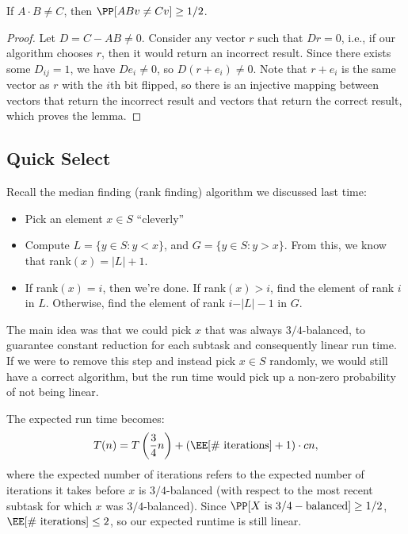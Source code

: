 \begin{theorem}
\lemlabel

If $A\cdot B\neq C$, then $\PP[ABv\neq Cv]\geq 1/2$.
\end{theorem}

\begin{proof}
Let $D = C-AB \neq 0$. Consider any vector $r$ such that $Dr=0$, i.e., if our algorithm chooses $r$, then it would return an incorrect result. Since there exists some $D_{ij}=1$, we have $De_{i}\neq 0$, so $D(r+e_{i})\neq 0$. Note that $r+e_{i}$ is the same vector as $r$ with the $i$th bit flipped, so there is an injective mapping between vectors that return the incorrect result and vectors that return the correct result, which proves the lemma. 
\end{proof}

\subsection{Quick Select}

Recall the median finding (rank finding) algorithm we discussed last time: 
\begin{itemize}
    \item Pick an element $x\in S$ ``cleverly''
    \item Compute $L = \{y\in S : y < x\}$, and $G = \{y\in S : y > x\}$. From this, we know that rank$(x) = \vert L\vert + 1$. 
    \item If rank$(x) = i$, then we're done. If rank$(x) > i$, find the element of rank $i$ in $L$. Otherwise, find the element of rank $i-\vert L\vert - 1$ in $G$.
\end{itemize}
The main idea was that we could pick $x$ that was always $3/4$-balanced, to guarantee constant reduction for each subtask and consequently linear run time. If we were to remove this step and instead pick $x\in S$ randomly, we would still have a correct algorithm, but the run time would pick up a non-zero probability of not being linear.

The expected run time becomes:
\[T(n) = T\left(\frac{3}{4}n\right) + \left(\EE[\text{\# iterations}] + 1\right)\cdot cn,\]
where the expected number of iterations refers to the expected number of iterations it takes before $x$ is $3/4$-balanced (with respect to the most recent subtask for which $x$ was $3/4$-balanced). Since $\PP[X\text{ is }3/4-\text{balanced}]\geq 1/2$, $\EE[\text{\# iterations}]\leq 2$, so our expected runtime is still linear.  